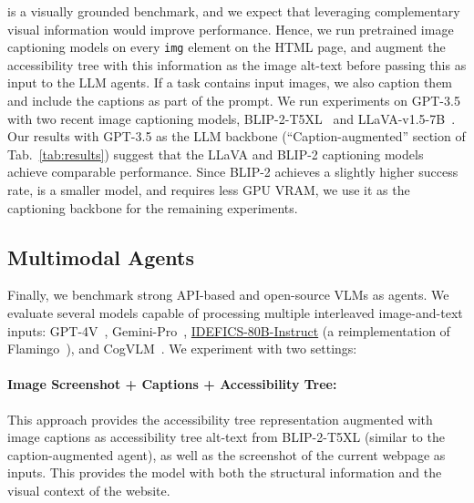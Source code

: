 \BenchmarkName{} is a visually grounded benchmark, and we expect that leveraging complementary visual information would improve performance. Hence, we run pretrained image captioning models on every \texttt{img} element on the HTML page, and augment the accessibility tree with this information as the image alt-text before passing this as input to the LLM agents. If a task contains input images, we also caption them and include the captions as part of the prompt. We run experiments on GPT-3.5 with two recent image captioning models, BLIP-2-T5XL~\citep{li2023blip} and LLaVA-v1.5-7B~\citep{liu2023improved}. Our results with GPT-3.5 as the LLM backbone (``Caption-augmented'' section of Tab.~\ref{tab:results}) suggest that the LLaVA and BLIP-2 captioning models achieve comparable performance. Since BLIP-2 achieves a slightly higher success rate, is a smaller model, and requires less GPU VRAM, we use it as the captioning backbone for the remaining experiments.

\subsection{Multimodal Agents} \label{sec:som_method}


Finally, we benchmark strong API-based and open-source VLMs as agents. 
We evaluate several models capable of processing multiple interleaved image-and-text inputs: GPT-4V~\citep{openai2023gpt4}, Gemini-Pro~\citep{team2023gemini}, \href{https://huggingface.co/HuggingFaceM4/idefics-80b-instruct}{IDEFICS-80B-Instruct} (a reimplementation of Flamingo~\citep{alayrac2022flamingo}), and CogVLM~\citep{wang2023cogvlm}. 
We experiment with two settings:

\paragraph{Image Screenshot + Captions + Accessibility Tree:} This approach provides the accessibility tree representation augmented with image captions as accessibility tree alt-text from BLIP-2-T5XL (similar to the caption-augmented agent), as well as the screenshot of the current webpage as inputs. This provides the model with both the structural information and the visual context of the website.

